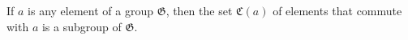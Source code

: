 If $a$ is any element of a group $\mathfrak{G}$, then the set $\mathfrak{C}(a)$ of elements that commute with $a$ is a subgroup of $\mathfrak{G}$.
